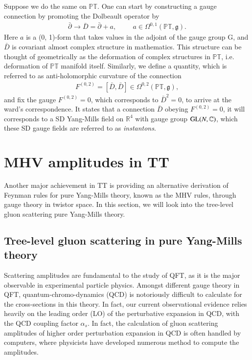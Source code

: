 \documentclass{article}
\begin{document}
    Suppose we do the same on $\mathbb{PT}$. One can start by
    constructing a gauge connection by promoting the Dolbeault operator
    by 
    \begin{align}
      \label{dolbeault connection}
      \bar \partial_{}^{} \to \bar D = \bar \partial_{}^{} + a,
      \hspace{1cm} a \in \Omega^{0,1}(\mathbb{PT}, \mathfrak{g}).
    \end{align} Here $a$ is a (0, 1)-form that takes values in the
    adjoint of the gauge group G, and $\bar D$ is covariant almost
    complex structure in mathematics. This structure can be thought
    of geometrically as the deformation of complex structures in
    $\mathbb{PT}$, i.e. deformation of $\mathbb{PT}$ manifold itself.
    Similarly, we define a quantity, which is referred to as
    anti-holomorphic curvature of the connection 
    \begin{align}
      \label{name}
      F^{(0, 2)} = [\bar D, \bar D] \in \Omega^{0, 2}(
      \mathbb{PT}, \mathfrak{g} ), 
    \end{align}
    and fix the gauge $F^{(0, 2)} = 0$, which corresponds to $ \bar
    D^2 =  0 $, to arrive at the ward's correspondence. It states
    that a connection $\bar D$ obeying $F^{(0, 2)} = 0$, it will
    corresponds to a SD Yang-Mills field on $\mathbb{R}^4$ with gauge
    group $\textnormal{GL}(N, \mathbb{C})$, which these SD gauge fields
    are referred to as \textit{instantons}\cite{schafer1998instantons}. 
  \section{MHV amplitudes in TT}%
    \label{sec:uMHV amplitudes in TT}
    Another major achievement in TT is providing an alternative
    derivation of Feynman rules for pure Yang-Mills theory, known as
    the MHV rules\cite{schwartz2014quantum}, through gauge theory in twistor space. In this
    section, we will look into the tree-level gluon scattering pure
    Yang-Mills theory. 

    \subsection{Tree-level gluon scattering in pure Yang-Mills theory}%
      \label{sub: Tree-level gluon scattering in pure Yang-Mills theory}
      Scattering amplitudes are fundamental to the study of QFT, as it
      is the major observable in experimental particle physics. Amongst
      different gauge theory in QFT, quantum-chromo-dynamics (QCD)
      is notoriously difficult to calculate for the cross-sections
      in this theory. In fact, our current observational evidence
      relies heavily on the leading order (LO) of the perturbative
      expansion in QCD, with the QCD coupling factor $\alpha_s$.
      In fact, the calculation of gluon scattering amplitudes of higher
      order perturbation expansion in QCD is often handled by
      computers, where physicists have developed numerous method
      to compute the
      amplitudes\cite{dixon2016brief}\cite{elvang2013scattering}.
      
\end{document}
